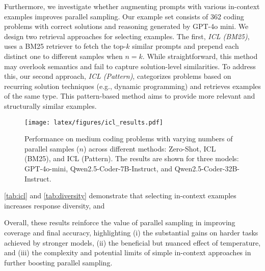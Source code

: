 Furthermore, we investigate whether augmenting prompts with various in-context examples improves parallel sampling. Our example set consists of 362 coding problems with correct solutions and reasoning generated by GPT-4o mini. We design two retrieval approaches for selecting examples. The first, \emph{ICL (BM25)}, uses a BM25 retriever to fetch the top-$k$ similar prompts and prepend each distinct one to different samples when $n = k$. While straightforward, this method may overlook semantics and fail to capture solution-level similarities. To address this, our second approach, \emph{ICL (Pattern)}, categorizes problems based on recurring solution techniques (e.g., dynamic programming) and retrieves examples of the same type. This pattern-based method aims to provide more relevant and structurally similar examples.

\begin{figure*}[ht]
    \centering
    \texttt{[image: latex/figures/icl\_results.pdf]}
    \caption{Performance on medium coding problems with varying numbers of parallel samples (\(n\)) across different methods: Zero-Shot, ICL (BM25), and ICL (Pattern). The results are shown for three models: GPT-4o-mini, Qwen2.5-Coder-7B-Instruct, and Qwen2.5-Coder-32B-Instruct.}
    \label{fig:icl_performance}
\end{figure*}


\ref{tab:icl} and \ref{tab:diversity} demonstrate that selecting in-context examples increases response diversity, and 


Overall, these results reinforce the value of parallel sampling in improving coverage and final accuracy, highlighting (i) the substantial gains on harder tasks achieved by stronger models, (ii) the beneficial but nuanced effect of temperature, and (iii) the complexity and potential limits of simple in-context approaches in further boosting parallel sampling.


